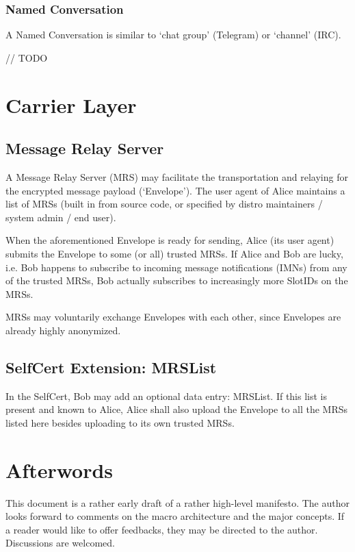 \documentclass[a4paper,11pt]{article}
\begin{document}
\subsubsection{Named Conversation}
A Named Conversation is similar to `chat group' (Telegram) or `channel' (IRC).

// TODO












\section{Carrier Layer}

\subsection{Message Relay Server}

A Message Relay Server (MRS) may facilitate the transportation and relaying for the encrypted message payload (`Envelope').
The user agent of Alice maintains a list of MRSs (built in from source code, or specified by distro maintainers / system admin / end user).

When the aforementioned Envelope is ready for sending, Alice (its user agent) submits the Envelope to some (or all) trusted MRSs.
If Alice and Bob are lucky, i.e. Bob happens to subscribe to incoming message notifications (IMNs) from any of the trusted MRSs,
Bob actually subscribes to increasingly more SlotIDs on the MRSs.

MRSs may voluntarily exchange Envelopes with each other, since Envelopes are already highly anonymized.

\subsection{SelfCert Extension: MRSList}

In the SelfCert, Bob may add an optional data entry: MRSList.
If this list is present and known to Alice, Alice shall also upload the Envelope to all the MRSs listed here besides uploading to its own trusted MRSs.





\section{Afterwords}

This document is a rather early draft of a rather high-level manifesto.
The author looks forward to comments on the macro architecture and the major concepts.
If a reader would like to offer feedbacks, they may be directed to the author. Discussions are welcomed.
\end{document}
